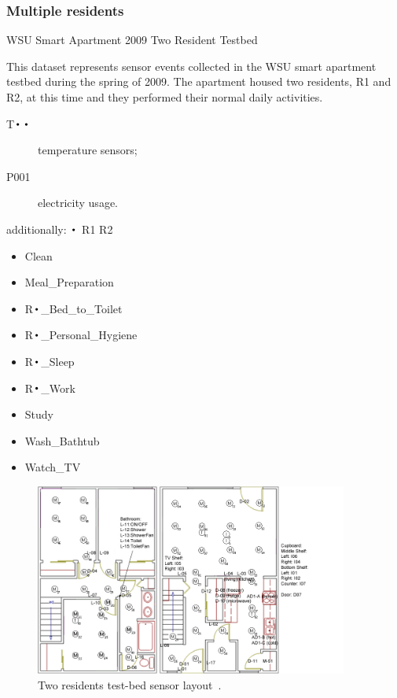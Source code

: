 \documentclass[12pt, a4paper, pdflatex, leqno, twoside, openright]{report}
\DeclareMathOperator*{\Bigcdot}{\scalerel*{\cdot}{\bigodot}}
\begin{document}
      \subsubsection{Multiple residents}
WSU Smart Apartment 2009 Two Resident Testbed

This dataset represents sensor events collected in the WSU smart apartment testbed during the spring of 2009.  The apartment housed two residents, R1 and R2, at this time and they performed their normal daily activities.

\begin{description}
\item[T$\Bigcdot\Bigcdot$] temperature sensors;
\item[P001] electricity usage.
\end{description}

additionally: $\Bigcdot$ R1 R2
\begin{itemize}
\item Clean
\item Meal\_Preparation  
\item R$\Bigcdot$\_Bed\_to\_Toilet
\item R$\Bigcdot$\_Personal\_Hygiene
\item R$\Bigcdot$\_Sleep
\item R$\Bigcdot$\_Work
\item Study
\item Wash\_Bathtub
\item Watch\_TV
\end{itemize}

\begin{figure}[htb]
  \centering%
  \includegraphics[height=6.3cm]{gfx/sensorlayoutTWOR.jpg}
  \caption[Two residents test-bed sensor layout.]{Two residents test-bed sensor layout~\citep{cook2009assessing}.\label{fig:twor}}
\end{figure}
\end{document}
